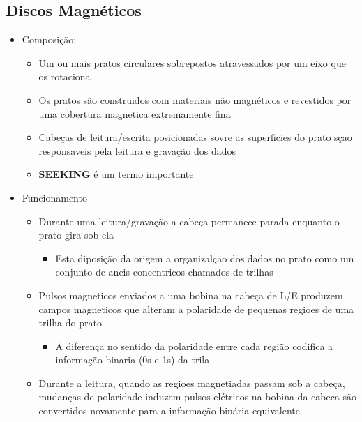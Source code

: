 \documentclass[12pt]{article}
\begin{document}
\subsection{Discos Magnéticos}
    \begin{itemize}
        \item Composição:
        \begin{itemize}
            \item Um ou mais pratos circulares sobrepostos atravessados por um 
            eixo que os rotaciona
            \item Os pratos são construidos com materiais não magnéticos e 
            revestidos por uma cobertura magnetica extremamente fina
            \item Cabeças de leitura/escrita posicionadas sovre as superficies 
            do prato sçao responsaveis pela leitura e gravação dos dados
            \item \textbf{SEEKING} é um termo importante
        \end{itemize}
        \item Funcionamento
        \begin{itemize}
            \item Durante uma leitura/gravação a cabeça permanece parada 
            enquanto o prato gira sob ela
            \begin{itemize}
                \item Esta diposição da origem a organizalçao dos dados no 
                prato como um conjunto de aneis concentricos chamados de trilhas
            \end{itemize}
            \item Pulsos magneticos enviados a uma bobina na cabeça de L/E 
            produzem campos magneticos que alteram a polaridade de pequenas 
            regioes de uma trilha do prato
            \begin{itemize}
                \item A diferença no sentido da polaridade entre cada região 
                codifica a informação binaria (0s e 1s) da trila 
            \end{itemize}
            \item Durante a leitura, quando as regioes magnetiadas passam sob 
            a cabeça, mudanças de polaridade induzem pulsos elétricos na bobina 
            da cabeca são convertidos novamente para a informação binária 
            equivalente
        \end{itemize}

\end{itemize}
\end{document}
